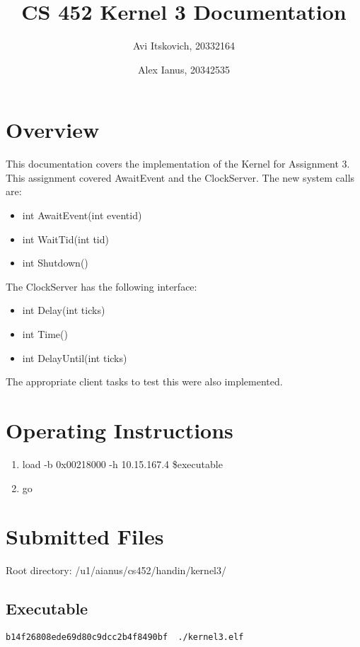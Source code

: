 \documentclass{article}
\title{CS 452 Kernel 3 Documentation}
\author{
  Avi Itskovich, 20332164
  \and
  Alex Ianus, 20342535
}
\begin{document}
\maketitle

\section{Overview}

This documentation covers the implementation of the Kernel for Assignment 3. This assignment covered AwaitEvent and the ClockServer. The new system calls are: 
\begin{itemize}
  \item int AwaitEvent(int eventid)
  \item int WaitTid(int tid)
  \item int Shutdown()
\end{itemize}
The ClockServer has the following interface:
\begin{itemize}
  \item int Delay(int ticks)
  \item int Time()
  \item int DelayUntil(int ticks)
\end{itemize}
The appropriate client tasks to test this were also implemented.

\section{Operating Instructions}
\begin{enumerate}
  \item load -b 0x00218000 -h 10.15.167.4 \$executable
  \item go
\end{enumerate}

\section{Submitted Files}
Root directory: /u1/aianus/cs452/handin/kernel3/

\subsection{Executable}
\begin{verbatim}
b14f26808ede69d80c9dcc2b4f8490bf  ./kernel3.elf
\end{verbatim}
\end{document}

